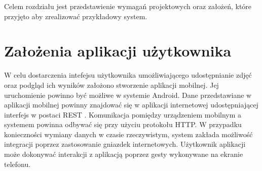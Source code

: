 Celem rozdziału jest przedstawienie wymagań projektowych oraz założeń, które przyjęto aby zrealizować przykładowy system. 

\section{Założenia aplikacji użytkownika}{
W celu dostarczenia intefejsu użytkownika umożliwiającego udostępnianie zdjęć oraz podgląd ich wyników założono stworzenie aplikacji mobilnej. Jej uruchomienie powinno być możliwe w systemie Android. Dane przedstawiane w aplikacji mobilnej powinny znajdować się w aplikacji internetowej udostępniającej interfejs w postaci REST \cite{REST}. Komunikacja pomiędzy urządzeniem mobilnym a systemem powinna odbywać się przy użyciu protokołu HTTP. W przypadku konieczności wymiany danych w czasie rzeczywistym, system zakłada możliwość integracji poprzez zastosowanie gniazdek internetowych. Użytkownik aplikacji może dokonywać interakcji z aplikacją poprzez gesty wykonywane na ekranie telefonu. 
}

